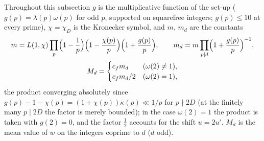 \documentclass[11pt,a4paper]{article}
\theoremstyle{remark}\newtheorem{remark}[theorem]{Remark}
\begin{document}
Throughout this subsection $g$ is the multiplicative function of the set-up ($g(p)=\lambda(p)\omega(p)$ for odd $p$,
supported on squarefree integers; $g(p)\le10$ at every prime), $\chi=\chi_D$ is the Kronecker symbol, and $m$, $m_d$
are the constants
\begin{equation}\label{eq:md}
\begin{gathered}
m=L(1,\chi)\prod_p\Bigl(1-\frac1p\Bigr)\Bigl(1-\frac{\chi(p)}p\Bigr)\Bigl(1+\frac{g(p)}p\Bigr),\qquad
m_d=m\prod_{p\mid d}\Bigl(1+\frac{g(p)}p\Bigr)^{-1},\\
M_d=\begin{cases}c_fm_d&(\omega(2)\ne1),\\ c_fm_d/2&(\omega(2)=1),\end{cases}
\end{gathered}
\end{equation}
the product converging absolutely since $g(p)-1-\chi(p)=(1+\chi(p))\kappa(p)\ll1/p$ for $p\nmid2D$ (at the finitely
many $p\mid2D$ the factor is merely bounded); in the case $\omega(2)=1$ the product is taken with $g(2)=0$, and the factor
$\tfrac12$ accounts for the shift $u=2u'$. $M_d$ is the mean value of $w$ on the integers coprime to $d$ ($d$ odd).
\end{document}
